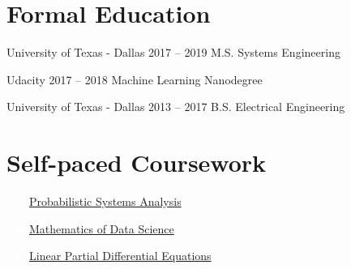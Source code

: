 \documentclass{tccv}
\begin{document}
\section{Formal Education}

\begin{yearlist} 

\item[University of Texas - Dallas]{2017 -- 2019}
     {M.S. Systems Engineering}{}

\item[Udacity]{2017 -- 2018}
	 {Machine Learning Nanodegree}{}

\item[University of Texas - Dallas]{2013 -- 2017}
     {B.S. Electrical Engineering}{}

\end{yearlist}
\vspace{-30pt}
\section{Self-paced Coursework}
\begin{factlist}
\item{\textcolor{white}{2018}}{\href{https://github.com/markditsworth/psa}{Probabilistic Systems Analysis}}
\item{\textcolor{white}{2018}}{\href{https://github.com/markditsworth/mds}{Mathematics of Data Science}}
\item{\textcolor{white}{2018}}{\href{https://github.com/markditsworth/linearPDE}{Linear Partial Differential Equations}}
\end{factlist}

\vspace{-15pt}
\end{document}
